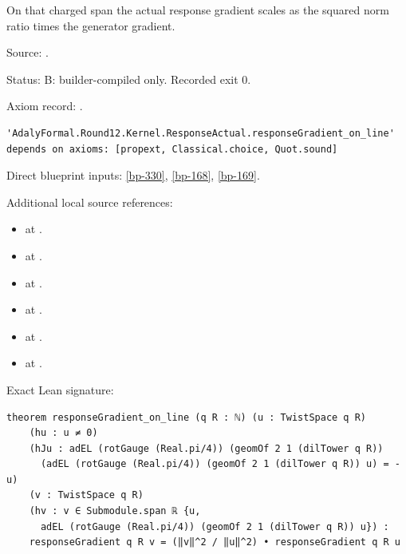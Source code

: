 \begin{theorem}[bp-229]
\label{bp-229}
\leanok
On that charged span the actual response gradient scales as the squared norm ratio times the generator gradient.

\par Source: \texttt{}.
\par Status: B: builder-compiled only. Recorded exit 0.
\par Axiom record: \texttt{}.
\begin{verbatim}
'AdalyFormal.Round12.Kernel.ResponseActual.responseGradient_on_line' depends on axioms: [propext, Classical.choice, Quot.sound]
\end{verbatim}
\par Direct blueprint inputs: \ref{bp-330}, \ref{bp-168}, \ref{bp-169}.
\par Additional local source references:
\begin{itemize}
\item \texttt{} at \texttt{}.
\item \texttt{} at \texttt{}.
\item \texttt{} at \texttt{}.
\item \texttt{} at \texttt{}.
\item \texttt{} at \texttt{}.
\item \texttt{} at \texttt{}.
\end{itemize}
\par Exact Lean signature:
\begin{verbatim}
theorem responseGradient_on_line (q R : ℕ) (u : TwistSpace q R)
    (hu : u ≠ 0)
    (hJu : adEL (rotGauge (Real.pi/4)) (geomOf 2 1 (dilTower q R))
      (adEL (rotGauge (Real.pi/4)) (geomOf 2 1 (dilTower q R)) u) = -u)
    (v : TwistSpace q R)
    (hv : v ∈ Submodule.span ℝ {u,
      adEL (rotGauge (Real.pi/4)) (geomOf 2 1 (dilTower q R)) u}) :
    responseGradient q R v = (‖v‖^2 / ‖u‖^2) • responseGradient q R u
\end{verbatim}
\end{theorem}

